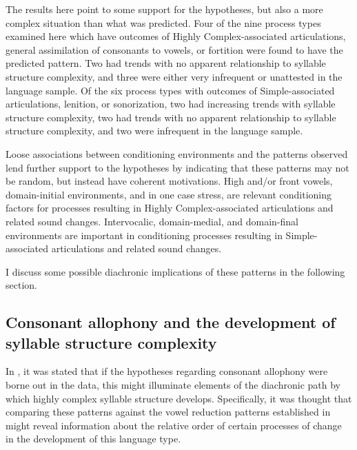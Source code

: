   The results here point to some support for the hypotheses, but also a more complex situation than what was predicted. Four of the nine process types examined here which have outcomes of Highly Complex-associated articulations, general assimilation of consonants to vowels, or fortition were found to have the predicted pattern. Two had trends with no apparent relationship to syllable structure complexity, and three were either very infrequent or unattested in the language sample. Of the six process types with outcomes of Simple-associated articulations, lenition, or sonorization, two had increasing trends with syllable structure complexity, two had trends with no apparent relationship to syllable structure complexity, and two were infrequent in the language sample.

  Loose associations between conditioning environments and the patterns observed lend further support to the hypotheses by indicating that these patterns may not be random, but instead have coherent motivations. High and/or front vowels, domain-initial environments, and in one case stress, are relevant conditioning factors for processes resulting in Highly Complex-associated articulations and related sound changes. Intervocalic, domain-medial, and domain-final environments are important in conditioning processes resulting in Simple-as\-so\-ci\-at\-ed articulations and related sound changes. 

  I discuss some possible diachronic implications of these patterns in the following section.

\subsection{Consonant allophony and the development of syllable structure complexity} \label{sec:7.4.1}

  In , it was stated that if the hypotheses regarding consonant allophony were borne out in the data, this might illuminate elements of the diachronic path by which highly complex syllable structure develops. Specifically, it was thought that comparing these patterns against the vowel reduction patterns established in  might reveal information about the relative order of certain processes of change in the development of this language type.

